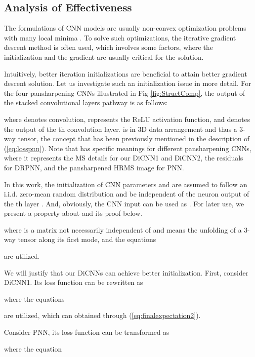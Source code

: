 \documentclass[journal]{IEEEtran}
\begin{document}
\subsection{Analysis of Effectiveness}
The formulations of CNN models are usually non-convex optimization problems with many local minima \cite{choro2015loss,bottou2010large,haykin2009neural}. To solve such optimizations,  the iterative gradient descent method is often used, which involves some factors, where the initialization and the gradient are usually critical for the solution.

Intuitively, better iteration initializations are beneficial to attain better gradient descent solution. Let us investigate such an initialization issue in more detail. For the four pansharpening CNNs illustrated in Fig \ref{fig:StructComp}, the output of the stacked convolutional layers pathway is as follows:

where  denotes convolution,  represents the ReLU activation function, and  denotes the output of the th convolution layer.  is in 3D data arrangement and thus a 3-way tensor, the concept that has been previously mentioned in the description of (\ref{eq:losspnn}). Note that  has specific meanings for different pansharpening CNNs, where it represents the MS details  for our DiCNN1 and DiCNN2, the residuals  for DRPNN, and the pansharpened HRMS image  for PNN.

In this work, the initialization of CNN parameters  and  are assumed to follow an i.i.d. zero-mean random distribution and be independent of the neuron output of the th layer . And, obviously, the CNN input  can be used as . For later use, we present a property about  and its proof below.
\begin{normalsize}

\end{normalsize}
where  is a matrix not necessarily independent of  and
 means the unfolding of a 3-way tensor along its first mode, and the equations

are utilized.

We will justify that our DiCNNs can achieve better initialization. First, consider DiCNN1. Its loss function  can be rewritten as


where the equations


are utilized, which can obtained through (\ref{eq:finalexpectation2}).

Consider PNN, its loss function  can be transformed as

where the equation
\end{document}
